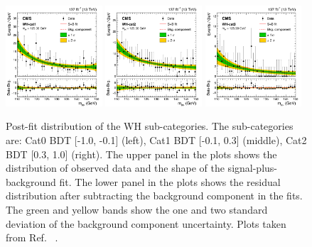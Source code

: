 \begin{figure}[!htb]
  \centering
  \captionsetup{justification=justified}
  \includegraphics[width=0.32\textwidth]{pics/VH_sec/VH_results/postfit_WH_cat1.png}
  \includegraphics[width=0.32\textwidth]{pics/VH_sec/VH_results/postfit_WH_cat2.png}
  \includegraphics[width=0.32\textwidth]{pics/VH_sec/VH_results/postfit_WH_cat3.png}
  \caption{Post-fit \mmm distribution of the WH sub-categories. The sub-categories are: Cat0 BDT [-1.0, -0.1] (left), Cat1 BDT [-0.1, 0.3] (middle), Cat2 BDT [0.3, 1.0] (right). 
           The upper panel in the plots shows the distribution of observed data and the shape of the signal-plus-background fit.
           The lower panel in the plots shows the residual distribution after subtracting the background component in the fits.
           The green and yellow bands show the one and two standard deviation of the background component uncertainty.
           Plots taken from Ref. ~\cite{Sirunyan_2021}.}
  \label{fig:wh_postfit}
\end{figure}


